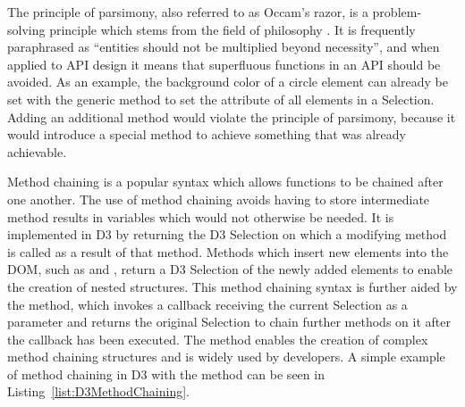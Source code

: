 The principle of parsimony, also referred to as Occam's razor, is a
problem-solving principle which stems from the field of philosophy
\parencite{PrincipleOfParsimony}. It is frequently paraphrased as
\enquote{entities should not be multiplied beyond necessity}, and when
applied to API design it means that superfluous functions in an API
should be avoided. As an example, the background color of a circle
element can already be set with the generic 
method to set the  attribute of all
elements in a Selection. Adding an additional 
method would violate the principle of parsimony, because it would
introduce a special method to achieve something that was already
achievable.

Method chaining is a popular syntax which allows functions to be
chained after one another. The use of method chaining avoids having to
store intermediate method results in variables which would not
otherwise be needed. It is implemented in D3 by returning the D3
Selection on which a modifying method is called as a result of that
method. Methods which insert new elements into the DOM, such as
 and , return a D3
Selection of the newly added elements to enable the creation of nested
structures. This method chaining syntax is further aided by the
 method, which invokes a callback receiving the
current Selection as a parameter and returns the original Selection to
chain further methods on it after the callback has been executed. The
 method enables the creation of complex method
chaining structures and is widely used by developers. A simple example
of method chaining in D3 with the  method can be
seen in Listing~\ref{list:D3MethodChaining}.



\begin{samepage}
%
A simple example of method chaining in D3.
A  element and a  element are created
inside an existing  element.
},
]{listings/d3-method-chaining.js}
\end{samepage}


